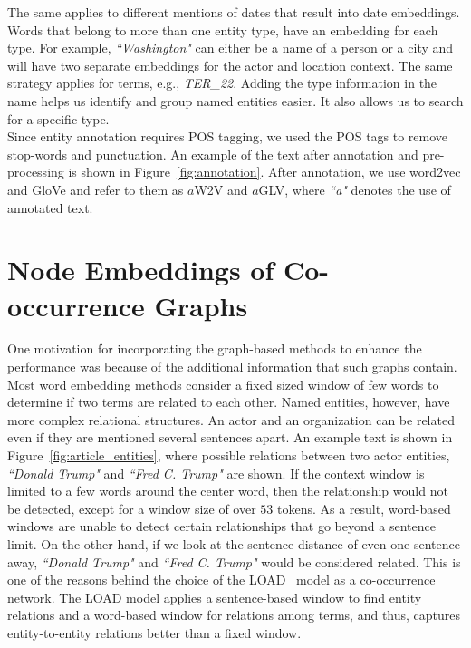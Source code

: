 The same applies to different mentions of dates that result into date embeddings. Words that belong to more than one entity type, have an embedding for each type. For example, \emph{``Washington"} can either be a name of a person or a city and will have two separate embeddings for the actor and location context. The same strategy applies for terms, e.g., \emph{TER\_22}. Adding the type information in the name helps us identify and group named entities easier. It also allows us to search for a specific type. \\
Since entity annotation requires POS tagging, we used the POS tags to remove stop-words and punctuation. An example of the text after annotation and pre-processing is shown in Figure~\ref{fig:annotation}. After annotation, we use word2vec and GloVe and refer to them as $a$W2V and $a$GLV, where \emph{``a"} denotes the use of annotated text. 

\section{Node Embeddings of Co-occurrence Graphs}\label{sec:graph_based}

One motivation for incorporating the graph-based methods to enhance the performance was because of the additional information that such graphs contain. Most word embedding methods consider a fixed sized window of few words to determine if two terms are related to each other. Named entities, however, have more complex relational structures. An actor and an organization can be related even if they are mentioned several sentences apart. An example text is shown in Figure~\ref{fig:article_entities}, where possible relations between two actor entities, \emph{``Donald Trump"} and \emph{``Fred C. Trump"} are shown. If the context window is limited to a few words around the center word, then the relationship would not be detected, except for a window size of over $53$ tokens. As a result, word-based windows are unable to detect certain relationships that go beyond a sentence limit. 
On the other hand, if we look at the sentence distance of even one sentence away, \emph{``Donald Trump"} and \emph{``Fred C. Trump"} would be considered related. This is one of the reasons behind the choice of the LOAD~ model as a co-occurrence network. The LOAD model applies a sentence-based window to find entity relations and a word-based window for relations among terms, and thus, captures entity-to-entity relations better than a fixed window.

